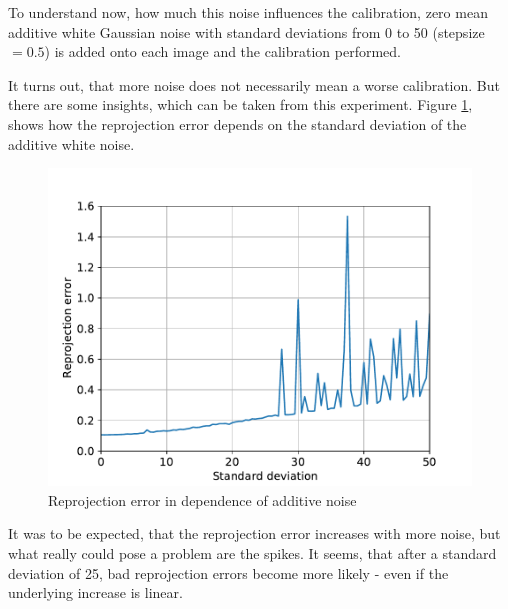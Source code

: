 To understand now, how much this noise influences the calibration, zero mean additive white Gaussian noise with standard deviations from 0 to 50 (stepsize $=0.5$) is added onto each image and the calibration performed. 

It turns out, that more noise does not necessarily mean a worse calibration.
But there are some insights, which can be taken from this experiment.
Figure \ref{development:noise_rpe}, shows how the reprojection error depends on the standard deviation of the additive white noise.
\begin{figure}
	\centering
	\includegraphics[width=0.9\linewidth]{3-development/calibration/images/noise_rpe.pdf}
	\caption{Reprojection error in dependence of additive noise\label{development:noise_rpe}}
\end{figure}
It was to be expected, that the reprojection error increases with more noise, but what really could pose a problem are the spikes.
It seems, that after a standard deviation of 25, bad reprojection errors become more likely - even if the underlying increase is linear.

